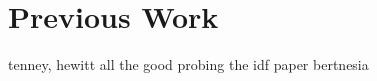 \chapter{Previous Work}
\label{chap:prev}
tenney, hewitt all the good probing
the idf paper
bertnesia